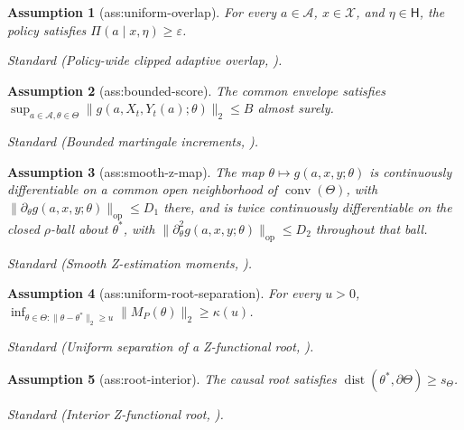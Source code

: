 \documentclass{article}
\newtheorem{assumption}{Assumption}
\begin{document}
\begin{assumption}[ass:uniform-overlap]\label{ass:uniform-overlap}
For every \(a\in\mathcal A\), \(x\in\mathcal X\), and \(\eta\in\mathsf H\), the policy satisfies \(\Pi(a\mid x,\eta)\ge\varepsilon\).
\par\smallskip\noindent\emph{Standard} (Policy-wide clipped adaptive overlap, \cite{GuoXu2026MisspecifiedBandits}).
\end{assumption}

\begin{assumption}[ass:bounded-score]\label{ass:bounded-score}
The common envelope satisfies \(\sup_{a\in\mathcal A,\theta\in\Theta}\|g(a,X_t,Y_t(a);\theta)\|_2\le B\) almost surely.
\par\smallskip\noindent\emph{Standard} (Bounded martingale increments, \cite{Mourrat2013MartingaleCLT}).
\end{assumption}

\begin{assumption}[ass:smooth-z-map]\label{ass:smooth-z-map}
The map \(\theta\mapsto g(a,x,y;\theta)\) is continuously differentiable on a common open neighborhood of \(\operatorname{conv}(\Theta)\), with \(\|\partial_\theta g(a,x,y;\theta)\|_{\mathrm{op}}\le D_1\) there, and is twice continuously differentiable on the closed \(\rho\)-ball about \(\theta^*\), with \(\|\partial_\theta^2 g(a,x,y;\theta)\|_{\mathrm{op}}\le D_2\) throughout that ball.
\par\smallskip\noindent\emph{Standard} (Smooth Z-estimation moments, \cite{GuoXu2026MisspecifiedBandits}).
\end{assumption}

\begin{assumption}[ass:uniform-root-separation]\label{ass:uniform-root-separation}
For every \(u>0\), \(\inf_{\theta\in\Theta:\|\theta-\theta^*\|_2\ge u}\|M_P(\theta)\|_2\ge\kappa(u)\).
\par\smallskip\noindent\emph{Standard} (Uniform separation of a Z-functional root, \cite{GuoXu2026MisspecifiedBandits}).
\end{assumption}

\begin{assumption}[ass:root-interior]\label{ass:root-interior}
The causal root satisfies \(\operatorname{dist}(\theta^*,\partial\Theta)\ge s_\Theta\).
\par\smallskip\noindent\emph{Standard} (Interior Z-functional root, \cite{GuoXu2026MisspecifiedBandits}).
\end{assumption}
\end{document}
